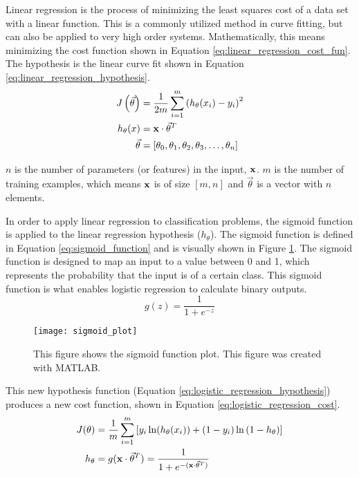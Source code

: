 Linear regression is the process of minimizing the least squares cost of a data set with a linear function.  This is a commonly utilized method in curve fitting, but can also be applied to very high order systems.  Mathematically, this means minimizing the cost function shown in Equation \ref{eq:linear_regression_cost_fun}.  The hypothesis is the linear curve fit shown in Equation \ref{eq:linear_regression_hypothesis}.
\begin{align}
	J\left(\vec{\theta}\right) &= \frac{1}{2m} \sum_{i=1}^{m}{\left(h_{\theta}(x_i) - y_i\right)^2} \label{eq:linear_regression_cost_fun} \\
	h_{\theta}(x) &= \mathbf{x} \cdot \vec{\theta}^T \label{eq:linear_regression_hypothesis} \\
	\vec{\theta} &= [\theta_0, \theta_1, \theta_2, \theta_3, \hdots, \theta_n]
\end{align}

$n$ is the number of parameters (or features) in the input, $\mathbf{x}$.  $m$ is the number of training examples, which means $\mathbf{x}$ is of size $[m, n]$ and $\vec{\theta}$ is a vector with $n$ elements.

In order to apply linear regression to classification problems, the sigmoid function is applied to the linear regression hypothesis ($h_{\theta}$).  The sigmoid function is defined in Equation \ref{eq:sigmoid_function} and is visually shown in Figure \ref{fig:sigmoid_plot}.  The sigmoid function is designed to map an input to a value between 0 and 1, which represents the probability that the input is of a certain class.  This sigmoid function is what enables logistic regression to calculate binary outputs.
\begin{equation} \label{eq:sigmoid_function}
	g(z) = \frac{1}{1+e^{-z}}
\end{equation}

\begin{figure}
	\centering
	\texttt{[image: sigmoid\_plot]}
	\decoRule
	\caption{This figure shows the sigmoid function plot.  This figure was created with MATLAB.}
	\label{fig:sigmoid_plot}
\end{figure}

This new hypothesis function (Equation \ref{eq:logistic_regression_hypothesis}) produces a new cost function, shown in Equation \ref{eq:logistic_regression_cost}.
\begin{align}
	J(\theta) &= \frac{1}{m} \sum_{i=1}^{m}{\left[y_i \ln({h_{\theta}(x_i))} + (1-y_i) \ln{(1-h_{\theta}}) \right]}  \label{eq:logistic_regression_cost} \\
	h_{\theta} &= g(\mathbf{x} \cdot \vec{\theta}^T) = \frac{1}{1+e^{-(\mathbf{x} \cdot \vec{\theta}^T)}} \label{eq:logistic_regression_hypothesis}
\end{align}

